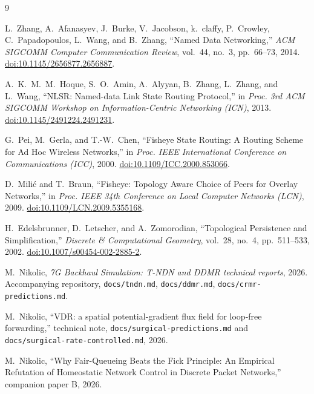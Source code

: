 \documentclass[10pt,a4paper]{article}
\begin{document}
\begin{thebibliography}{9}

L.~Zhang, A.~Afanasyev, J.~Burke, V.~Jacobson, k.~claffy, P.~Crowley,
C.~Papadopoulos, L.~Wang, and B.~Zhang,
``Named Data Networking,''
\emph{ACM SIGCOMM Computer Communication Review}, vol.~44, no.~3, pp.~66--73, 2014.
\href{https://doi.org/10.1145/2656877.2656887}{doi:10.1145/2656877.2656887}.

A.~K.~M.~M.~Hoque, S.~O.~Amin, A.~Alyyan, B.~Zhang, L.~Zhang, and L.~Wang,
``NLSR: Named-data Link State Routing Protocol,''
in \emph{Proc. 3rd ACM SIGCOMM Workshop on Information-Centric Networking (ICN)},
2013.
\href{https://doi.org/10.1145/2491224.2491231}{doi:10.1145/2491224.2491231}.

G.~Pei, M.~Gerla, and T.-W.~Chen,
``Fisheye State Routing: A Routing Scheme for Ad Hoc Wireless Networks,''
in \emph{Proc. IEEE International Conference on Communications (ICC)}, 2000.
\href{https://doi.org/10.1109/ICC.2000.853066}{doi:10.1109/ICC.2000.853066}.

D.~Mili\'c and T.~Braun,
``Fisheye: Topology Aware Choice of Peers for Overlay Networks,''
in \emph{Proc. IEEE 34th Conference on Local Computer Networks (LCN)}, 2009.
\href{https://doi.org/10.1109/LCN.2009.5355168}{doi:10.1109/LCN.2009.5355168}.

H.~Edelsbrunner, D.~Letscher, and A.~Zomorodian,
``Topological Persistence and Simplification,''
\emph{Discrete \& Computational Geometry}, vol.~28, no.~4, pp.~511--533, 2002.
\href{https://doi.org/10.1007/s00454-002-2885-2}{doi:10.1007/s00454-002-2885-2}.

M.~Nikolic,
\emph{7G Backhaul Simulation: T-NDN and DDMR technical reports},
2026. Accompanying repository, \texttt{docs/tndn.md}, \texttt{docs/ddmr.md},
\texttt{docs/crmr-predictions.md}.

M.~Nikolic,
``VDR: a spatial potential-gradient flux field for loop-free forwarding,''
technical note, \texttt{docs/surgical-predictions.md} and
\texttt{docs/surgical-rate-controlled.md}, 2026.

M.~Nikolic,
``Why Fair-Queueing Beats the Fick Principle: An Empirical Refutation of
Homeostatic Network Control in Discrete Packet Networks,''
companion paper B, 2026.

\end{thebibliography}
\end{document}
